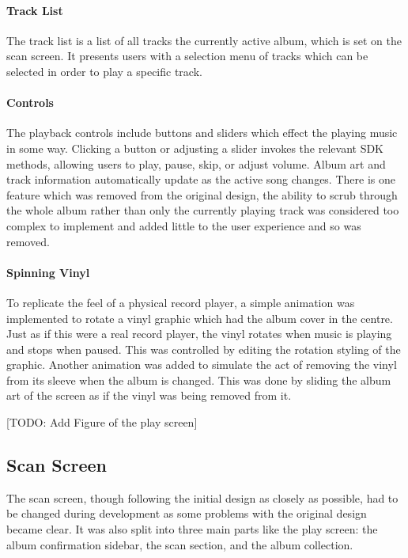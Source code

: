 \paragraph{Track List} The track list is a list of all tracks the currently active album, which is set on the scan screen. It presents users with a selection menu of tracks which can be selected in order to play a specific track.

\paragraph{Controls} The playback controls include buttons and sliders which effect the playing music in some way. Clicking a button or adjusting a slider invokes the relevant SDK methods, allowing users to play, pause, skip, or adjust volume. Album art and track information automatically update as the active song changes. There is one feature which was removed from the original design, the ability to scrub through the whole album rather than only the currently playing track was considered too complex to implement and added little to the user experience and so was removed.

\paragraph{Spinning Vinyl} To replicate the feel of a physical record player, a simple animation was implemented to rotate a vinyl graphic which had the album cover in the centre. Just as if this were a real record player, the vinyl rotates when music is playing and stops when paused. This was controlled by editing the rotation styling of the graphic. Another animation was added to simulate the act of removing the vinyl from its sleeve when the album is changed. This was done by sliding the album art of the screen as if the vinyl was being removed from it.

[TODO: Add Figure of the play screen]


\subsection{Scan Screen}
The scan screen, though following the initial design as closely as possible, had to be changed during development as some problems with the original design became clear. It was also split into three main parts like the play screen: the album confirmation sidebar, the scan section, and the album collection.

